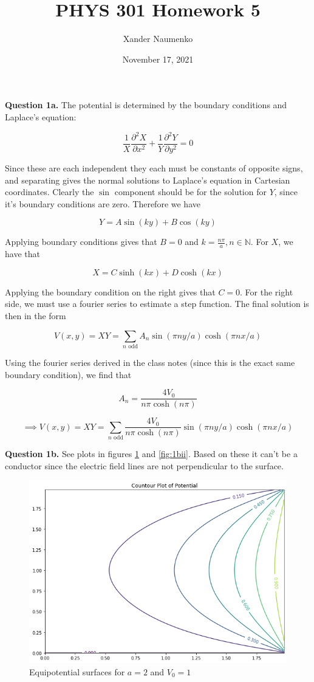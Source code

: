 \documentclass[letterpaper, reqno,11pt]{article}
\newcommand{\NN}{\mathbb{N}}
\begin{document}
\title{PHYS 301 Homework 5}
\date{November 17, 2021}
\author{Xander Naumenko}
\maketitle

{\noindent\bf Question 1a.} The potential is determined by the boundary conditions and Laplace's equation: 

\[
    \frac1X\frac{\partial^2 X}{\partial x^2}+\frac1Y\frac{\partial^2 Y}{\partial y^2}=0    
\]

Since these are each independent they each must be constants of opposite signs, and separating gives the normal solutions to Laplace's equation in Cartesian coordinates. Clearly the $\sin$ component should be for the solution for $Y$, since it's boundary conditions are zero. Therefore we have 

\[
    Y=A\sin(ky)+B\cos(ky)
\]

Applying boundary conditions gives that $B=0$ and $k=\frac{n\pi}{a}, n\in\NN$. For $X$, we have that 

\[
    X=C\sinh(kx)+D\cosh(kx)
\]

Applying the boundary condition on the right gives that $C=0$. For the right side, we must use a fourier series to estimate a step function. The final solution is then in the form 

\[
    V(x, y)=XY=\sum_{n\text{ odd}}A_n\sin(\pi ny/a)\cosh(\pi nx/a)
\]

Using the fourier series derived in the class notes (since this is the exact same boundary condition), we find that 

\[
    A_n=\frac{4V_0}{n\pi\cosh(n\pi)}
\]

\[
    \implies V(x, y)=XY=\sum_{n\text{ odd}}\frac{4V_0}{n\pi\cosh(n\pi)}\sin(\pi ny/a)\cosh(\pi nx/a)
\]

{\noindent\bf Question 1b.} See plots in figures \ref{fig:1bi} and \ref{fig:1bii}. Based on these it can't be a conductor since the electric field lines are not perpendicular to the surface. 

\begin{figure}[htbp]
\centering
\includegraphics[width=\textwidth]{q1bi}
\caption{Equipotential surfaces for $a=2$ and $V_0=1$}
\label{fig:1bi}
\end{figure}
\end{document}
